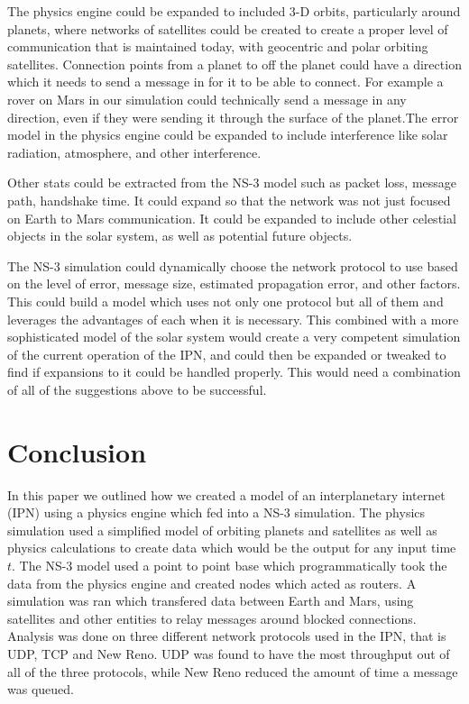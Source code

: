 \documentclass[a4paper,12pt]{article}
\begin{document}
The physics engine could be expanded to included 3-D orbits, particularly around
planets, where networks of satellites could be created to create a proper level
of communication that is maintained today, with geocentric and polar orbiting
satellites. Connection points from a planet to off the planet could have a
direction which it needs to send a message in for it to be able to connect. For
example a rover on Mars in our simulation could technically send a message in
any direction, even if they were sending it through the surface of the
planet.The error model in the physics engine could be expanded to include
interference like solar radiation, atmosphere, and other interference.

Other stats could be extracted from the NS-3 model such as packet loss, message
path, handshake time. It could expand so that the network was not just focused
on Earth to Mars communication. It could be expanded to include other celestial
objects in the solar system, as well as potential future objects.

The NS-3 simulation could dynamically choose the network protocol to use based
on the level of error, message size, estimated propagation error, and other
factors. This could build a model which uses not only one protocol but all of
them and leverages the advantages of each when it is necessary. This combined
with a more sophisticated model of the solar system would create a very
competent simulation of the current operation of the IPN, and could then be
expanded or tweaked to find if expansions to it could be handled properly. This
would need a combination of all of the suggestions above to be successful.

\section{Conclusion}

In this paper we outlined how we created a model of an interplanetary internet
(IPN) using a physics engine which fed into a NS-3 simulation. The physics
simulation used a simplified model of orbiting planets and satellites as well as
physics calculations to create data which would be the output for any input time
$t$. The NS-3 model used a point to point base which programmatically took the
data from the physics engine and created nodes which acted as routers. A
simulation was ran which transfered data between Earth and Mars, using
satellites and other entities to relay messages around blocked connections.
Analysis was done on three different network protocols used in the IPN, that is
UDP, TCP and New Reno. UDP was found to have the most throughput out of all of
the three protocols, while New Reno reduced the amount of time a message was
queued.

\printbibliography{}
\end{document}
